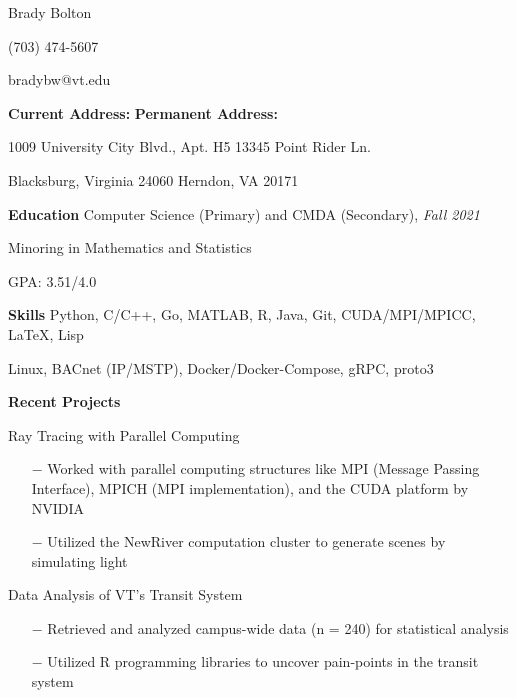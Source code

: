 \documentclass{article}
\begin{document}
	\begin{center}
	
		\huge{Brady Bolton}
		
		\large{(703) 474-5607}
		
		\large{bradybw@vt.edu}
	
	\end{center}

\textbf{Current Address:} \hfill \textbf{Permanent Address:}

1009 University City Blvd., Apt. H5 \hfill 13345 Point Rider Ln.

Blacksburg, Virginia 24060 \hfill Herndon, VA 20171

\vline

\textbf{\large{Education}} \quad Computer Science (Primary) and CMDA (Secondary), \textit{Fall 2021}

\qquad \qquad \qquad \hspace{10pt} Minoring in Mathematics and Statistics

\qquad \qquad \qquad \hspace{10pt} GPA: 3.51/4.0

\vline

\textbf{\large{Skills}} \qquad \qquad Python, C/C++, Go, MATLAB, R, Java, Git, CUDA/MPI/MPICC, \LaTeX, Lisp

\qquad \qquad \qquad \hspace{10pt} Linux, BACnet (IP/MSTP), Docker/Docker-Compose, gRPC, proto3

\vline

\textbf{\large{Recent Projects}} 

\vspace{5pt}

{\setlength{\leftskip}{15pt}
	{\selectfont Ray Tracing with Parallel Computing}
	\vspace{-5pt}
	\begin{itemize}
		\setlength{\leftskip}{15pt}
		\setlength\itemsep{-0.5em}
		\item[$-$] Worked with parallel computing structures like MPI (Message Passing Interface), MPICH (MPI implementation), and the CUDA platform by NVIDIA
		\item[$-$] Utilized the NewRiver computation cluster to generate scenes by simulating light
	\end{itemize}
	
	{\selectfont Data Analysis of VT’s Transit System}
	\vspace{-5pt}
	\begin{itemize}
		\setlength{\leftskip}{15pt}
		\setlength\itemsep{-0.5em}
		\item[$-$] Retrieved and analyzed campus-wide data (n = 240) for statistical analysis
		\item[$-$] Utilized R programming libraries to uncover pain-points in the transit system
	\end{itemize}
}
\setlength{\leftskip}{0cm}
\end{document}
